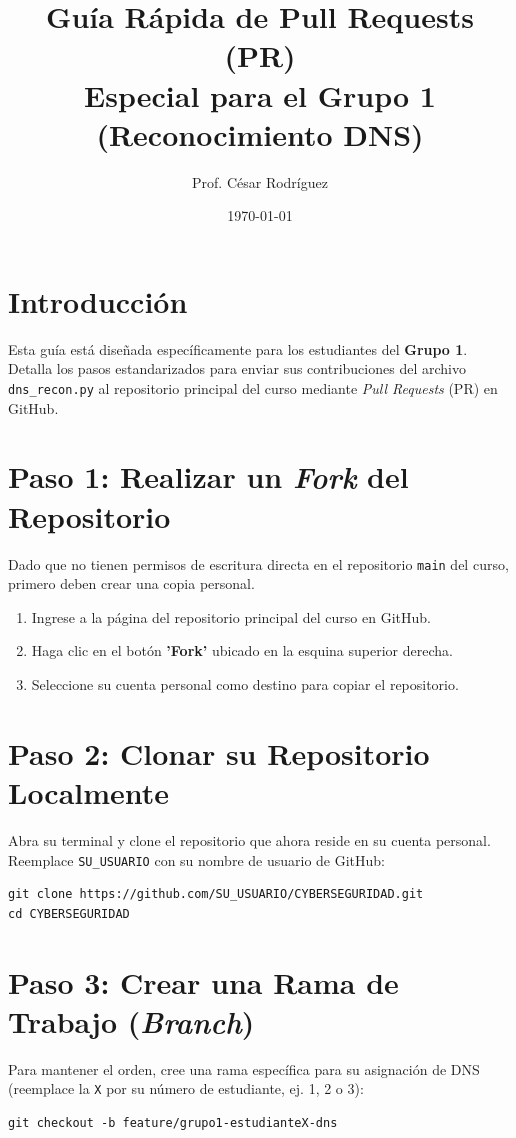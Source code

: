 \documentclass[12pt,a4paper]{article}
\title{Guía Rápida de Pull Requests (PR) \\ \large Especial para el Grupo 1 (Reconocimiento DNS)}
\author{Prof. César Rodríguez}
\date{\today}
\begin{document}
\maketitle

\section*{Introducción}
Esta guía está diseñada específicamente para los estudiantes del \textbf{Grupo 1}. Detalla los pasos estandarizados para enviar sus contribuciones del archivo \texttt{dns\_recon.py} al repositorio principal del curso mediante \textit{Pull Requests} (PR) en GitHub.

\section{Paso 1: Realizar un \textit{Fork} del Repositorio}
Dado que no tienen permisos de escritura directa en el repositorio \texttt{main} del curso, primero deben crear una copia personal.
\begin{enumerate}
    \item Ingrese a la página del repositorio principal del curso en GitHub.
    \item Haga clic en el botón \textbf{'Fork'} ubicado en la esquina superior derecha.
    \item Seleccione su cuenta personal como destino para copiar el repositorio.
\end{enumerate}

\section{Paso 2: Clonar su Repositorio Localmente}
Abra su terminal y clone el repositorio que ahora reside en su cuenta personal. Reemplace \texttt{SU\_USUARIO} con su nombre de usuario de GitHub:
\begin{verbatim}
git clone https://github.com/SU_USUARIO/CYBERSEGURIDAD.git
cd CYBERSEGURIDAD
\end{verbatim}

\section{Paso 3: Crear una Rama de Trabajo (\textit{Branch})}
Para mantener el orden, cree una rama específica para su asignación de DNS (reemplace la \texttt{X} por su número de estudiante, ej. 1, 2 o 3):
\begin{verbatim}
git checkout -b feature/grupo1-estudianteX-dns
\end{verbatim}
\end{document}
